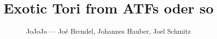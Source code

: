 \documentclass[11pt,a4paper,draft]{scrartcl}
\begin{document}
\title{Exotic Tori from ATFs oder so}
\author{JoJoJo — Joé Brendel, Johannes Hauber, Joel Schmitz}

\maketitle
\end{document}
